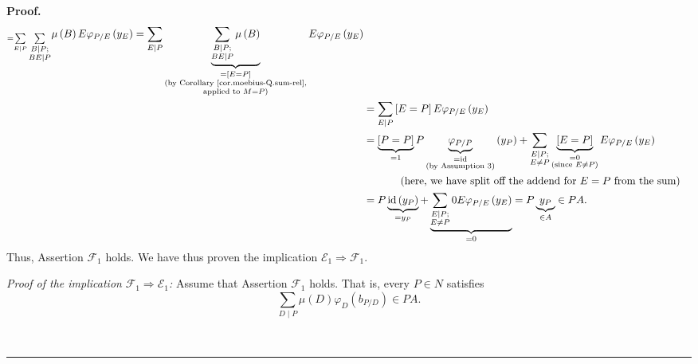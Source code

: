 \documentclass[numbers=enddot,12pt,final,onecolumn,notitlepage]{scrartcl}%
\theoremstyle{definition}
\newenvironment{proof}[1][Proof]{\noindent\textbf{#1.} }{\ \rule{0.5em}{0.5em}}
\let\sumnonlimits\sum
\renewcommand{\sum}{\sumnonlimits\limits}
\begin{document}
\begin{proof}
\begin{align*}
_{=\sum_{E\mid P}\sum_{\substack{B\mid P;\\BE\mid P}}}\mu\left(  B\right)
E\varphi_{P/E}\left(  y_{E}\right)  =\sum_{E\mid P}\underbrace{\sum
_{\substack{B\mid P;\\BE\mid P}}\mu\left(  B\right)  }_{\substack{=\left[
E=P\right]  \\\text{(by Corollary \ref{cor.moebius-Q.sum-rel},}\\\text{applied
to }M=P\text{)}}}E\varphi_{P/E}\left(  y_{E}\right) \\
&  =\sum_{E\mid P}\left[  E=P\right]  E\varphi_{P/E}\left(  y_{E}\right) \\
&  =\underbrace{\left[  P=P\right]  }_{=1}P\underbrace{\varphi_{P/P}%
}_{\substack{=\operatorname*{id}\\\text{(by Assumption 3)}}}\left(
y_{P}\right)  +\sum_{\substack{E\mid P;\\E\neq P}}\underbrace{\left[
E=P\right]  }_{\substack{=0\\\text{(since }E\neq P\text{)}}}E\varphi
_{P/E}\left(  y_{E}\right) \\
&  \ \ \ \ \ \ \ \ \ \ \left(  \text{here, we have split off the addend for
}E=P\text{ from the sum}\right) \\
&  =P\underbrace{\operatorname*{id}\left(  y_{P}\right)  }_{=y_{P}%
}+\underbrace{\sum_{\substack{E\mid P;\\E\neq P}}0E\varphi_{P/E}\left(
y_{E}\right)  }_{=0}=P\underbrace{y_{P}}_{\in A}\in PA.
\end{align*}
Thus, Assertion $\mathcal{F}_{1}$ holds. We have thus proven the implication
$\mathcal{E}_{1}\Longrightarrow\mathcal{F}_{1}$.

\textit{Proof of the implication }$\mathcal{F}_{1}\Longrightarrow
\mathcal{E}_{1}$\textit{:} Assume that Assertion $\mathcal{F}_{1}$ holds. That
is, every $P\in N$ satisfies%
\begin{equation}
\sum_{D\mid P}\mu\left(  D\right)  \varphi_{D}\left(  b_{P/D}\right)  \in PA.
\label{pf.thm.F.gW.FtoE.ass}%
\end{equation}



\end{proof}
\end{document}
